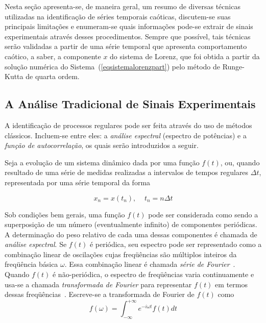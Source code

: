 Nesta seção apresenta-se, de maneira geral, um resumo de diversas técnicas utilizadas na identificação de séries temporais caóticas, discutem-se suas principais limitações e enumeram-se quais informações pode-se extrair de sinais experimentais através desses procedimentos. Sempre que possível, tais técnicas serão validadas a partir de uma série temporal que apresenta comportamento caótico, a saber, a componente $x$ do sistema de Lorenz, que foi obtida a partir da solução numérica do Sistema~(\ref{eqsistemalorenzpart}) pelo método de Runge-Kutta de quarta ordem.

\subsection{A Análise Tradicional de Sinais Experimentais}
\label{secanalisetrad}

A identificação de processos regulares pode ser feita através do uso de métodos clássicos. Incluem-se entre eles: a \textit{análise espectral} (espectro de potências) e a \textit{função de autocorrelação}, os quais serão introduzidos a seguir.

Seja a evolução de um sistema dinâmico dada por uma função $f(t)$, ou, quando resultado de uma série de medidas realizadas a intervalos de tempos regulares $\Delta t$, representada por uma série temporal da forma

\begin{equation}
{x_{n}}=x(t_{n}), \;\;\;\; t_{n}=n\Delta t
\label{eqserietemp}
\end{equation}

Sob condições bem gerais, uma função $f(t)$ pode ser considerada como sendo a superposição de um número (eventualmente infinito) de componentes periódicas. A determinação do peso relativo de cada uma dessas componentes é chamada de \textit{análise espectral}. Se $f(t)$ é periódica, seu espectro pode ser representado como a combinação linear de oscilações cujas freqüências são múltiplos inteiros da freqüência básica $\omega$. Essa combinação linear é chamada \textit{série de Fourier}~\cite{papoulis/62}. Quando $f(t)$ é não-periódica, o espectro de freqüências varia continuamente e usa-se a chamada \textit{transformada de Fourier} para representar $f(t)$ em termos dessas freqüências~\cite{papoulis/62}. Escreve-se a transformada de Fourier de $f(t)$ como
\begin{equation}
f(\omega)=\int_{-\infty}^{+\infty}e^{-i\omega t}f(t)dt
\label{eqfouriercont}
\end{equation} 

